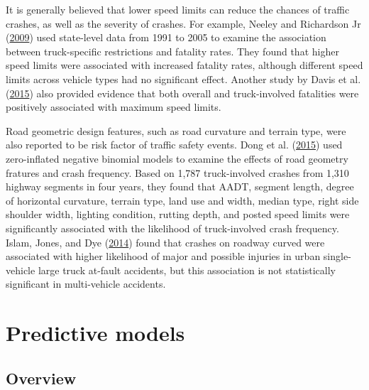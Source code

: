 \documentclass[12pt]{book}
\numberwithin{equation}{chapter}
\begin{document}
It is generally believed that lower speed limits can reduce the chances of traffic crashes, as well as the severity of crashes. For example, Neeley and Richardson Jr (\protect\hyperlink{ref-neeley2009effect}{2009}) used state-level data from 1991 to 2005 to examine the association between truck-specific restrictions and fatality rates. They found that higher speed limits were associated with increased fatality rates, although different speed limits across vehicle types had no significant effect. Another study by Davis et al. (\protect\hyperlink{ref-davis2015longitudinal}{2015}) also provided evidence that both overall and truck-involved fatalities were positively associated with maximum speed limits.

Road geometric design features, such as road curvature and terrain type, were also reported to be risk factor of traffic safety events. Dong et al. (\protect\hyperlink{ref-dong2015assessment}{2015}) used zero-inflated negative binomial models to examine the effects of road geometry fratures and crash frequency. Based on 1,787 truck-involved crashes from 1,310 highway segments in four years, they found that AADT, segment length, degree of horizontal curvature, terrain type, land use and width, median type, right side shoulder width, lighting condition, rutting depth, and posted speed limits were significantly associated with the likelihood of truck-involved crash frequency. Islam, Jones, and Dye (\protect\hyperlink{ref-islam2014comprehensive}{2014}) found that crashes on roadway curved were associated with higher likelihood of major and possible injuries in urban single-vehicle large truck at-fault accidents, but this association is not statistically significant in multi-vehicle accidents.

\hypertarget{predictive-models}{%
\section{Predictive models}\label{predictive-models}}

\hypertarget{overview}{%
\subsection{Overview}\label{overview}}
\end{document}
